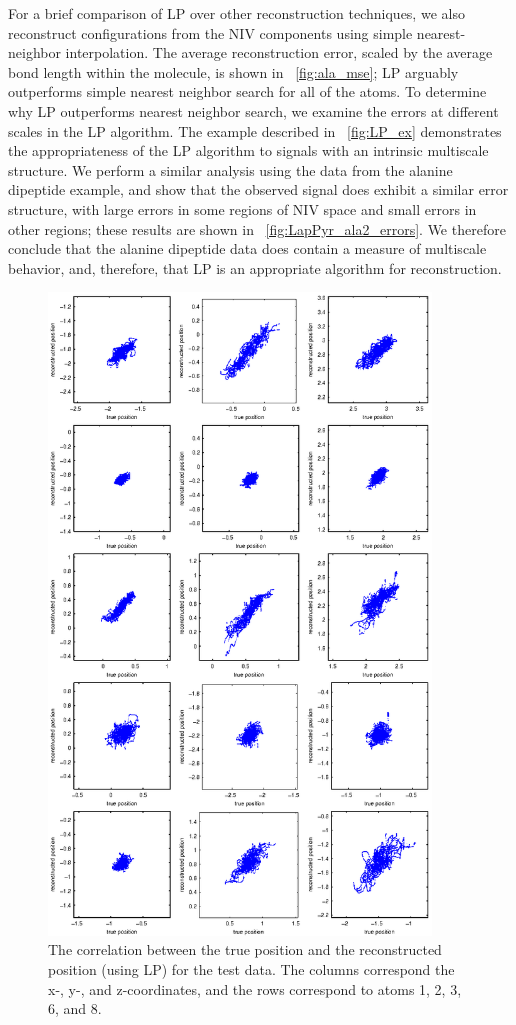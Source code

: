 For a brief comparison of LP over other reconstruction techniques, we also reconstruct configurations from the
NIV components using simple nearest-neighbor interpolation.
%
The average reconstruction error, scaled by the average bond length within the molecule, is shown in \fig~\ref{fig:ala_mse};
LP arguably outperforms simple nearest neighbor search for all of the atoms.
%
To determine why LP outperforms nearest neighbor search, we examine the errors at different scales in the LP algorithm.
%
The example described in \fig~\ref{fig:LP_ex} demonstrates the appropriateness of the LP algorithm to signals with an intrinsic multiscale structure.
%
We perform a similar analysis using the data from the alanine dipeptide example, and show that the observed signal does exhibit a similar error structure,
with large errors in some regions of NIV space and small errors in other regions;
these results are shown in \fig~\ref{fig:LapPyr_ala2_errors}.
%
We therefore conclude that the alanine dipeptide data does contain a measure of multiscale behavior, and, therefore, that LP is an appropriate algorithm for reconstruction.

\begin{figure}[t]
  \centering
        \includegraphics[width=4in]{fig9}
  \caption[Laplacian pyramids reconstruction for alanine dipeptide data]{The correlation between the true position and the reconstructed position (using LP) for the test data. The columns correspond the x-, y-, and z-coordinates, and the rows correspond to atoms 1, 2, 3, 6, and 8.}
  \label{fig:ala_recon}
\end{figure}

